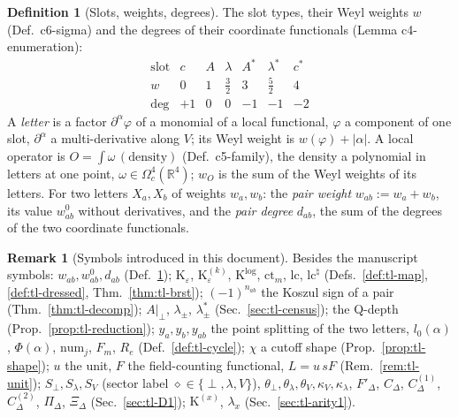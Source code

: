 \documentclass[11pt]{article}
\numberwithin{equation}{section}
\theoremstyle{plain}
\theoremstyle{definition}
\newtheorem{definition}[theorem]{Definition}
\newtheorem{remark}[theorem]{Remark}
\begin{document}
\begin{definition}[Slots, weights, degrees]
\label{def:tl-slots}
The slot types, their Weyl weights $w$ (Def.~c6-sigma) and the degrees of their coordinate functionals (Lemma c4-enumeration):
\[
\begin{array}{c|cccccc}
\text{slot} & c & A & \lambda & A^* & \lambda^* & c^*\\\hline
w & 0 & 1 & \tfrac32 & 3 & \tfrac52 & 4\\
\deg & +1 & 0 & 0 & -1 & -1 & -2
\end{array}
\]
A \emph{letter} is a factor $\partial^\alpha\varphi$ of a monomial of a local functional, $\varphi$ a component of one slot, $\partial^\alpha$ a multi-derivative along $V$; its Weyl weight is $w(\varphi)+|\alpha|$. A local operator is $O=\int\omega\,(\text{density})$ (Def.~c5-family), the density a polynomial in letters at one point, $\omega\in\Omega^4_c(\mathbb R^4)$; $w_O$ is the sum of the Weyl weights of its letters. For two letters $X_a,X_b$ of weights $w_a,w_b$: the \emph{pair weight} $w_{ab}:=w_a+w_b$, its value $w^0_{ab}$ without derivatives, and the \emph{pair degree} $d_{ab}$, the sum of the degrees of the two coordinate functionals.
\end{definition}

\begin{remark}[Symbols introduced in this document]
\label{rem:tl-symbols}
Besides the manuscript symbols: $w_{ab},w^0_{ab},d_{ab}$ (Def.~\ref{def:tl-slots}); $\mathrm K_\varepsilon$, $\mathrm K^{(k)}_\varepsilon$, $\mathrm K^{\log}$, $\mathrm{ct}_m$, $\mathrm{lc}$, $\mathrm{lc}^\natural$ (Defs.~\ref{def:tl-map}, \ref{def:tl-dressed}, Thm.~\ref{thm:tl-brst}); $(-1)^{n_{ab}}$ the Koszul sign of a pair (Thm.~\ref{thm:tl-decomp}); $A|_\perp$, $\lambda_\pm$, $\lambda^*_\pm$ (Sec.~\ref{sec:tl-census}); the Q-depth (Prop.~\ref{prop:tl-reduction}); $y_a,y_b,y_{ab}$ the point splitting of the two letters, $l_0(\alpha)$, $\Phi(\alpha)$, $\mathrm{num}_j$, $F_m$, $R_e$ (Def.~\ref{def:tl-cycle}); $\chi$ a cutoff shape (Prop.~\ref{prop:tl-shape}); $u$ the unit, $F$ the field-counting functional, $L=u\,sF$ (Rem.~\ref{rem:tl-unit}); $S_\perp,S_\lambda,S_V$ (sector label $\diamond\in\{\perp,\lambda,V\}$), $\theta_\perp,\theta_\lambda,\theta_V,\kappa_V,\kappa_\lambda$, $F'_\Delta$, $C_\Delta$, $C^{(1)}_\Delta$, $C^{(2)}_\Delta$, $\Pi_\Delta$, $\Xi_\Delta$ (Sec.~\ref{sec:tl-D1}); $\mathrm K^{(x)}$, $\lambda_x$ (Sec.~\ref{sec:tl-arity1}).
\end{remark}
\end{document}

